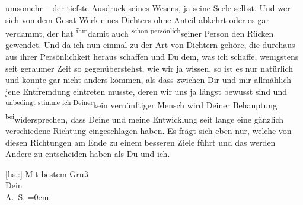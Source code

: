                umsomehr – der tiefste Ausdruck seines Wesens, ja seine Seele selbst. Und wer sich
               von dem \introOben{}Gesa{\geminationm}t-\introOben{}Werk eines
               Dichters ohne Anteil abkehrt oder es gar verdammt, der hat \substVorne{}\textsuperscript{ihm}\substDazwischen{}damit\substHinten{} auch \substVorne{}\textsuperscript{schon persönlich}\substDazwischen{}seiner Person\substHinten{} den Rücken gewendet. Und da ich nun einmal zu der Art von Dichtern gehöre,
               die  durchaus aus ihrer Persönlichkeit heraus schaffen und Du dem, was
               ich schaffe, wenigstens seit geraumer Zeit so gegenüberstehst, wie wir ja wissen, so
               ist es nur natürlich und konnte gar nicht anders kommen, als dass zwichen Dir und mir
               allmählich {\pb}jene Entfremdung eintreten
               musste, deren wir uns ja längst bewusst sind und \substVorne{}\textsuperscript{unbedingt stimme ich Deiner}\substDazwischen{}kein vernünftiger Mensch wird Deiner\substHinten{} Behauptung \substVorne{}\textsuperscript{bei}\substDazwischen{}widersprechen\substHinten{}, dass Deine und meine Entwicklung seit lange eine gänzlich verschiedene
               Richtung eingeschlagen haben. Es frägt sich eben nur, welche von diesen Richtungen am
               Ende zu einem besseren Ziele führt und das werden Andere zu entscheiden haben als Du
               und ich.\pend
           
\pstart
           {[}hs.:{]} Mit bestem Gruß {\\[\baselineskip]}Dein {\\[\baselineskip]}\spacefill\mbox{A. S.}\pend
           \leftskip=0em{}\endnumbering{}  
      